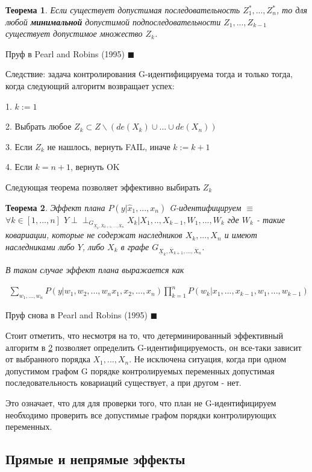\documentclass[fleqn]{article}
\newcommand{\independent}{\perp \!\!\! \perp}
\newtheorem{theorem}{Теорема}
\numberwithin{equation}{section}
\numberwithin{theorem}{section}
\numberwithin{figure}{section}
\numberwithin{lemma}{section}
\begin{document}
\begin{theorem}
	Если существует допустимая последовательность $Z_1^*,...,Z_n^*$,  то для любой \textbf{минимальной} допустимой подпоследовательности  $Z_1,...,Z_{k-1}$ существует допустимое множество $Z_k$.
\end{theorem}
 
 Пруф в Pearl and Robins (1995) $\blacksquare$
 
Следствие: задача контролирования G-идентифицируема тогда и только тогда, когда следующий алгоритм возвращает успех:

1. $k := 1$

2. Выбрать любое $Z_k \subset Z \backslash (de(X_k) \cup ... \cup de(X_n))$ 

3. Если $Z_k$ не нашлось, вернуть FAIL, иначе $k := k + 1$

4. Если $k = n + 1$, вернуть OK

Следующая теорема позволяет эффективно выбирать $Z_k$

\begin{theorem}
	\label{th:plan_identification}
	Эффект плана $P(y|\hat x_1,...,x_n)$ G-идентифицируем $\equiv$ $\forall k \in [1,...,n]$ $Y \independent_{G_{\underline{X}_k,\overline{X}_{k+1},...,\overline{X}_n}}X_k | X_1,..,X_{k-1},W_1,...,W_k$ где $W_k$ - такие ковариации, которые не содержат наследников $X_k,...,X_n$ и имеют наследниками либо $Y$, либо $X_k$ в графе  $G_{\underline{X}_k,\overline{X}_{k+1},...,\overline{X}_n}$. 
	
	В таком случае эффект плана выражается как 
	
	\begin{align}
		\sum\limits_{w_1,...,w_n}P(y|w_1, w_2,...,w_n x_1, x_2,...,x_n)\prod\limits_{k=1}^nP(w_k|x_1,...,x_{k-1},w_1,...,w_{k-1})
	\end{align}
\end{theorem}
 
 Пруф снова в Pearl and Robins (1995) $\blacksquare$
 
 
 Стоит отметить, что несмотря на то, что детерминированный эффективный алгоритм в \ref{th:plan_identification} позволяет определить G-идентифицируемость, он все-таки зависит от выбранного порядка $X_1,...,X_n$. Не исключена ситуация, когда при одном допустимом графом G порядке контролируемых переменных допустимая последовательность ковариаций существует, а при другом - нет.
 
 Это означает, что для для проверки того, что план не G-идентифицируем необходимо проверить все допустимые графом порядки контролирующих переменных.
 
 \subsection*{Прямые и непрямые эффекты}
 
  
\end{document}
